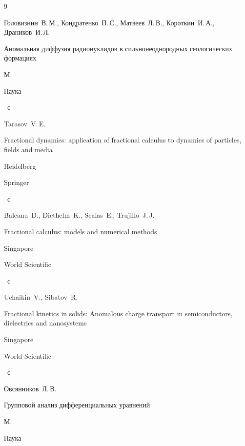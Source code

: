 \begin{thebibliography}{9}
	


\by Головизнин~В.\,М., Кондратенко~П.\,С., Матвеев~Л.\,В., Короткин~И.\,А., Драников~И.\,Л.

\book Аномальная диффузия радионуклидов в сильнонеоднородных геологических формациях

\publaddr М.

\publ Наука


~с




\by Tarasov~V.\,E.

\book Fractional dynamics: application of fractional calculus to dynamics of particles, fields and media

\publaddr Heidelberg

\publ Springer


~с

	


\by Baleanu~D., Diethelm~K., Scalas~E., Trujillo~J.\,J.

\book Fractional calculus: models and numerical methods

\publaddr Singapore

\publ World Scientific


~с

	


\by	Uchaikin~V., Sibatov~R.

\book Fractional kinetics in solids: Anomalous charge transport in semicon\-ductors, dielectrics and nanosystems

\publaddr Singapore

\publ World Scientific


~с

	


\by Овсянников~Л.\,В.

\book Групповой анализ дифференциальных уравнений

\publaddr М.

\publ Наука



\end{thebibliography}

